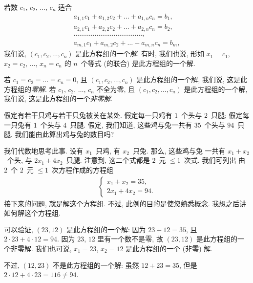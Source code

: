 若数 \(c_1\), \(c_2\), \(\dots\), \(c_n\) 适合
\begin{align*}
    a_{1,1} c_1 + a_{1,2} c_2 + \dots + a_{1,n} c_n = b_1, \\
    a_{2,1} c_1 + a_{2,2} c_2 + \dots + a_{2,n} c_n = b_2, \\
    \dots \dots \dots \dots
    \dots \dots \dots \dots
    \dots \dots \dots \dots
    ,                                                      \\
    a_{m,1} c_1 + a_{m,2} c_2 + \dots + a_{m,n} c_n = b_m,
\end{align*}
我们说, \((c_1, c_2, \dots, c_n)\)
是此方程组的一个\emph{解}.
有时, 我们也说, 形如
\(x_1 = c_1\),
\(x_2 = c_2\),
\(\dots\),
\(x_n = c_n\)
的 \(n\)~个等式 (的联合)
是此方程组的一个解.

若 \(c_1 = c_2 = \dots = c_n = 0\),
且 \((c_1, c_2, \dots, c_n)\) 是此方程组的一个解,
我们说, 这是此方程组的\emph{零解}.
若 \(c_1\), \(c_2\), \(\dots\), \(c_n\) 不全为零,
且 \((c_1, c_2, \dots, c_n)\) 是此方程组的一个解,
我们说, 这是此方程组的一个\emph{非零解}.

\begin{example}
    假定有若干只鸡与若干只兔被关在某处.
    假定每一只鸡有 \(1\)~个头与 \(2\)~只腿;
    假定每一只兔有 \(1\)~个头与 \(4\)~只腿.
    假定, 我们知道,
    这些鸡与兔一共有 \(35\)~个头与 \(94\)~只腿.
    我们能由此算出鸡与兔的数目吗?

    我们代数地思考此事.
    设有 \(x_1\)~只鸡, 有 \(x_2\)~只兔.
    那么,
    这些鸡与兔%
    一共有 \(x_1 + x_2\)~个头,
    与 \(2x_1 + 4x_2\)~只腿.
    注意到, 这二个式都是 \(2\)~元 \({\leq} 1\)~次式.
    我们可列出%
    由 \(2\)~个 \(2\)~元 \({\leq} 1\)~次方程作成的方程组
    \begin{align*}
        \begin{cases}
            x_1 + x_2 = 35, \\
            2x_1 + 4x_2 = 94.
        \end{cases}
    \end{align*}
    接下来的问题, 就是解这个方程组.
    不过,
    此例的目的是使您熟悉概念.
    我想之后讲如何解这个方程组.

    可以验证, \((23, 12)\) 是此方程组的一个解:
    因为 \(23 + 12 = 35\),
    且 \(2 \cdot 23 + 4 \cdot 12 = 94\).
    因为 \(23\), \(12\) 里有一个数不是零,
    故 \((23, 12)\) 是此方程组的一个非零解.
    我们也可说,
    \(x_1 = 23\),
    \(x_2 = 12\)
    是此方程组的一个 (非零) 解.

    不过, \((12, 23)\) 不是此方程组的一个解:
    虽然 \(12 + 23 = 35\),
    但是 \(2 \cdot 12 + 4 \cdot 23 = 116 \neq 94\).
\end{example}

